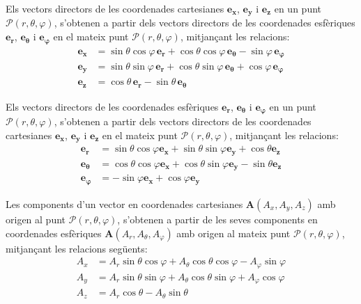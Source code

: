 \documentclass[catalan,a4paper,twoside,11pt]{article}
\begin{document}
Els vectors directors de les coordenades cartesianes  $\boldsymbol{e_x}$, $\boldsymbol{e_y}$ i $\boldsymbol{e_z}$ en un punt  $\mathscr{P}(r,\theta,\varphi)$, s'obtenen a partir dels vectors directors de les coordenades esfèriques $\boldsymbol{e_r}$, $\boldsymbol{e_\theta}$ i $\boldsymbol{e_\varphi}$ en el mateix punt $\mathscr{P}(r,\theta,\varphi)$, mitjançant les relacions:
\begin{subequations}\begin{align}
		\boldsymbol{e_x} &=\sin\theta\cos\varphi\,\boldsymbol{e_r}+
		\cos\theta\cos\varphi\,\boldsymbol{e_\theta}-\sin\varphi\,\boldsymbol{e_\varphi}\\
		\boldsymbol{e_y} &=\sin\theta\sin\varphi\,\boldsymbol{e_r}+
		\cos\theta\sin\varphi\,\boldsymbol{e_\theta}+\cos\varphi\,\boldsymbol{e_\varphi}\\
		\boldsymbol{e_z} &=\cos\theta\,\boldsymbol{e_r}-\sin\theta\,\boldsymbol{e_\theta}
\end{align}\end{subequations}


Els vectors directors de les coordenades esfèriques $\boldsymbol{e_r}$, $\boldsymbol{e_\theta}$ i $\boldsymbol{e_\varphi}$ en un punt $\mathscr{P}(r,\theta,\varphi)$, s'obtenen a partir dels vectors directors de les coordenades cartesianes $\boldsymbol{e_x}$, $\boldsymbol{e_y}$ i $\boldsymbol{e_z}$ en el mateix punt $\mathscr{P}(r,\theta,\varphi)$, mitjançant les relacions:
\begin{subequations}\begin{align}
    \boldsymbol{e_r} &=\sin\theta\cos\varphi\boldsymbol{e_x}+ \sin\theta\sin\varphi\boldsymbol{e_y}+\cos\theta\boldsymbol{e_z}\\
    \boldsymbol{e_\theta} &=\cos\theta\cos\varphi\boldsymbol{e_x}+
    \cos\theta\sin\varphi\boldsymbol{e_y}-\sin\theta\boldsymbol{e_z}\\
    \boldsymbol{e_\varphi}&=-\sin\varphi\boldsymbol{e_x}+\cos\varphi\boldsymbol{e_y}
\end{align}\end{subequations}


Les components d'un vector en coordenades cartesianes $\boldsymbol{A}(A_x, A_y, A_z)$ amb origen al punt $\mathscr{P}(r,\theta,\varphi)$, s'obtenen a partir de les seves components en coordenades esfèriques $\boldsymbol{A}(A_r, A_\theta, A_\varphi)$ amb origen al mateix punt $\mathscr{P}(r,\theta,\varphi)$, mitjançant les relacions següents:
\begin{subequations}\begin{align}
    A_x &= A_r\sin\theta\cos\varphi+A_\theta\cos\theta\cos\varphi-A_\varphi\sin\varphi \\
    A_y &= A_r\sin\theta\sin\varphi+A_\theta\cos\theta\sin\varphi+A_\varphi\cos\varphi\\
    A_z &= A_r\cos\theta-A_\theta\sin\theta
\end{align}\end{subequations}
\end{document}
